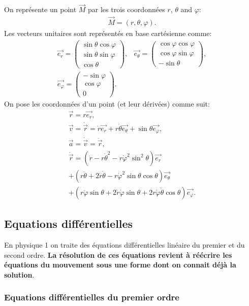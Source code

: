 \begin{multicols}{2}
    On représente un point $\vec{M}$ par les trois coordonnées $r$, $\theta$ and $\varphi$:
    \begin{align*}
        \vec{M} = (r, \theta, \varphi).
    \end{align*}
    Les vecteurs unitaires sont représentés en base cartésienne comme:
    \begin{align*}
        \vec{e_r} = \begin{pmatrix} 
            \sin \theta \cos \varphi  \\
            \sin \theta \sin \varphi \\
            \cos \theta
        \end{pmatrix}, & 
        \vec{e_\theta} = \begin{pmatrix} 
            \cos \varphi \cos \varphi \\
            \cos \varphi \sin \varphi \\
            - \sin \theta
        \end{pmatrix}, \\
        \vec{e_\varphi} = \begin{pmatrix} 
            -\sin \varphi \\
            \cos \varphi \\
            0
        \end{pmatrix}.
    \end{align*}
    On pose les coordonnées d'un point (et leur dérivées) comme suit:
    \begin{align*}
        \vec{r} = r \vec{e_r}, \\
        \vec{v} = \dot{\vec{r}} = \dot{r} \vec{e_r} + r \dot{\theta} \vec{e_\theta} + \sin \theta \vec{e_\varphi}, \\
        \vec{a} = \dot{\vec{v}} = \ddot{\vec{r}}, \\
        \ddot{\vec{r}} = (\ddot{r} - r \dot{\theta}^2 - r \dot{\varphi}^2 \sin^2 \theta) \vec{e_r}  \\
        + (r \ddot{\theta} + 2 \dot{r} \dot{\theta} - r \dot{\varphi}^2 \sin \theta \cos \theta) \vec{e_\theta} \\
        + (r \ddot{\varphi} \sin \theta + 2 \dot{r} \dot{\varphi}\sin\theta + 2 r \dot{\varphi} \dot{\theta} \cos \theta) \vec{e_\varphi}.
    \end{align*}
    
    \subsection{Equations différentielles}
    
    En physique 1 on traite des équations différentielles linéaire du premier et du second ordre. \textbf{La résolution de ces équations revient à réécrire les équations du mouvement sous une forme dont on connait déjà la solution}. 
    
    
    
    \subsubsection*{Equations différentielles du premier ordre}
    
\end{multicols}
    